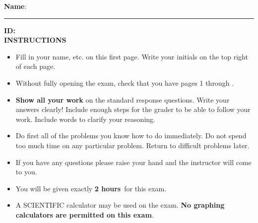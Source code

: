 \documentclass[addpoints,18pt,answers]{exam}
\newcommand{\exammin}{\textbf{2 hours}}
\begin{document}
\phantom{.}
\vspace{.2cm}

\noindent \textbf{Name}: 
\rule{.5\textwidth}{.2mm} \hspace{1cm} \textbf{ID:}
\hrulefill \\ 



\vspace{.2cm}
\textbf{INSTRUCTIONS}\\%
\phantom{.}\hspace{.7cm}
\begin{minipage}{6.3in}
	\begin{itemize}
		\item Fill in your name, etc. on this first page. Write your initials on the top right of each page.
		\item Without fully opening the exam, check that you have pages 1 through \totalnumpages.
		\item {\bf Show all your work} on the standard response questions. Write your answers clearly!  Include enough steps for the grader to be able to follow your work. Include words to clarify your reasoning.
		\item Do first all of the problems you know how to do immediately. Do not spend too much time on any particular problem. Return to difficult problems later.
		\item If you have any questions please raise your hand and the instructor will come to you.
		\item You will be given exactly \exammin \ for this exam.
		\item A SCIENTIFIC calculator may be used on the exam. \textbf{No graphing calculators are permitted on this exam}.
	\end{itemize}
\end{minipage}

\vspace{.2cm}
\newpage 
\end{document}
